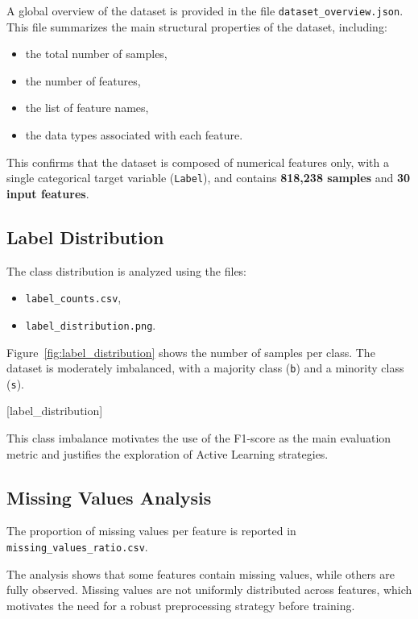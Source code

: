 \documentclass[12pt,a4paper]{article}
\begin{document}
A global overview of the dataset is provided in the file
\texttt{dataset\_overview.json}.
This file summarizes the main structural properties of the dataset, including:
\begin{itemize}
    \item the total number of samples,
    \item the number of features,
    \item the list of feature names,
    \item the data types associated with each feature.
\end{itemize}

This confirms that the dataset is composed of numerical features only, with a
single categorical target variable (\texttt{Label}), and contains
\textbf{818,238 samples} and \textbf{30 input features}.

\subsection{Label Distribution}

The class distribution is analyzed using the files:
\begin{itemize}
    \item \texttt{label\_counts.csv},
    \item \texttt{label\_distribution.png}.
\end{itemize}

Figure~\ref{fig:label_distribution} shows the number of samples per class.
The dataset is moderately imbalanced, with a majority class (\texttt{b})
and a minority class (\texttt{s}).

[label_distribution]

This class imbalance motivates the use of the F1-score as the main evaluation
metric and justifies the exploration of Active Learning strategies.

\subsection{Missing Values Analysis}

The proportion of missing values per feature is reported in
\texttt{missing\_values\_ratio.csv}.

The analysis shows that some features contain missing values, while others are
fully observed. Missing values are not uniformly distributed across features,
which motivates the need for a robust preprocessing strategy before training.
\end{document}
